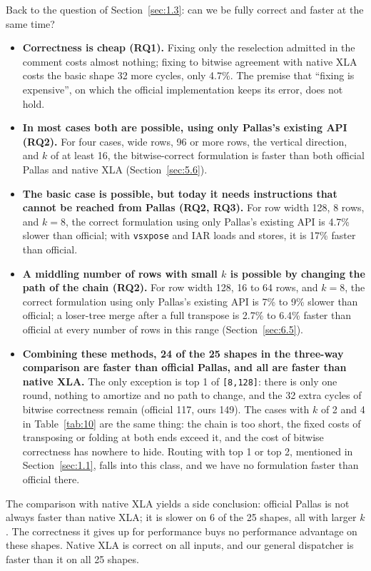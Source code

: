 \documentclass[sigconf,nonacm,balance=false]{acmart}
\newcommand{\code}[1]{\texttt{#1}}
\begin{document}
Back to the question of Section~\ref{sec:1.3}: can we be fully correct and faster at the same time?

\begin{itemize}
\item \textbf{Correctness is cheap (RQ1).} Fixing only the reselection admitted in the comment costs almost nothing; fixing to bitwise agreement with native XLA costs the basic shape 32 more cycles, only 4.7\%. The premise that ``fixing is expensive'', on which the official implementation keeps its error, does not hold.
\item \textbf{In most cases both are possible, using only Pallas's existing API (RQ2).} For four cases, wide rows, 96 or more rows, the vertical direction, and $k$ of at least 16, the bitwise-correct formulation is faster than both official Pallas and native XLA (Section~\ref{sec:5.6}).
\item \textbf{The basic case is possible, but today it needs instructions that cannot be reached from Pallas (RQ2, RQ3).} For row width 128, 8 rows, and $k = 8$, the correct formulation using only Pallas's existing API is 4.7\% slower than official; with \code{vsxpose} and IAR loads and stores, it is 17\% faster than official.
\item \textbf{A middling number of rows with small $k$ is possible by changing the path of the chain (RQ2).} For row width 128, 16 to 64 rows, and $k = 8$, the correct formulation using only Pallas's existing API is 7\% to 9\% slower than official; a loser-tree merge after a full transpose is 2.7\% to 6.4\% faster than official at every number of rows in this range (Section~\ref{sec:6.5}).
\item \textbf{Combining these methods, 24 of the 25 shapes in the three-way comparison are faster than official Pallas, and all are faster than native XLA.} The only exception is top 1 of \code{[8,\allowbreak{}128]}: there is only one round, nothing to amortize and no path to change, and the 32 extra cycles of bitwise correctness remain (official 117, ours 149). The cases with $k$ of 2 and 4 in Table~\ref{tab:10} are the same thing: the chain is too short, the fixed costs of transposing or folding at both ends exceed it, and the cost of bitwise correctness has nowhere to hide. Routing with top 1 or top 2, mentioned in Section~\ref{sec:1.1}, falls into this class, and we have no formulation faster than official there.
\end{itemize}

The comparison with native XLA yields a side conclusion: official Pallas is not always faster than native XLA; it is slower on 6 of the 25 shapes, all with larger $k$. The correctness it gives up for performance buys no performance advantage on these shapes. Native XLA is correct on all inputs, and our general dispatcher is faster than it on all 25 shapes.
\end{document}
